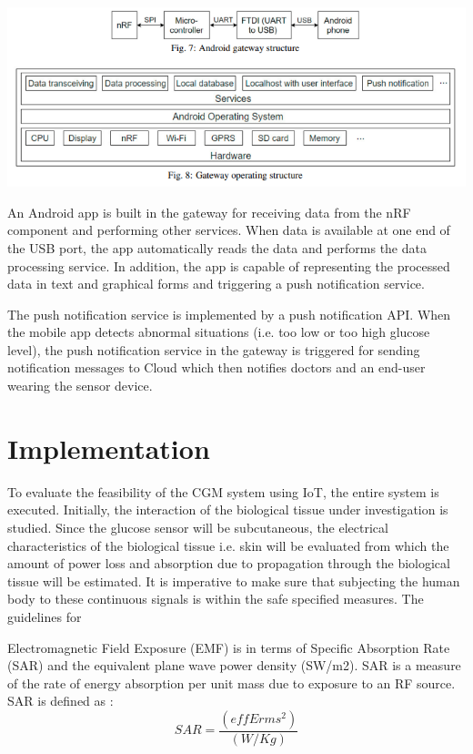 \documentclass{article}
\begin{document}
\begin{center}
  \includegraphics[scale=0.5]{back-end.png}
  \label{fig:back}
\end{center}


An Android app is built in the gateway for receiving data from the nRF component and performing other services. When data is available at one end of the USB port, the app automatically reads the data and performs the data processing service. In addition, the app is capable of representing the processed data in text and graphical forms and triggering a push notification service. 


The push notification service is implemented by a push notification API. When the mobile app detects abnormal situations (i.e. too low or too high glucose level), the push notification service in the gateway is triggered for sending notification messages to Cloud which then notifies doctors and an end-user wearing the sensor device. 


\section{ Implementation}
To evaluate the feasibility of the CGM system using IoT, the entire system is executed. Initially, the interaction of the biological tissue under investigation is studied. Since the glucose sensor will be subcutaneous, the electrical characteristics of the biological tissue i.e. skin will be evaluated from which the amount of power loss and absorption due to propagation through the biological tissue will be estimated. It is imperative to make sure that subjecting the human body to these continuous signals is within the safe specified measures. The guidelines for

Electromagnetic Field Exposure (EMF) is in terms of Specific Absorption Rate (SAR) and the equivalent plane wave power density (SW/m2). SAR is a measure of the rate of energy absorption per unit mass due to exposure to an RF source. SAR is defined as :
\begin{equation}
    SAR = \frac{(effErms^2 )}{(W/Kg)} 
\end{equation}
 
\end{document}
